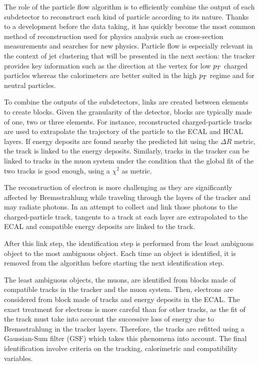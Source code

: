     The role of the particle flow algorithm \cite{particleFlow} is to efficiently combine the output of each
    subdetector to reconstruct each kind of particle according to its nature. Thanks
    to a development before the data taking, it has quickly become the most common
    method of reconstruction used for physics analysis such as cross-section measurements
    and searches for new physics. Particle flow is especially relevant in the context
    of jet clustering that will be presented in the next section: the tracker provides
    key information such as the direction at the vertex for low $p_T$ charged particles
    whereas the calorimeters are better suited in the high $p_T$ regime and for neutral
    particles.

    To combine the outputs of the subdetectors, links are created between elements
    to create blocks. Given the granularity of the detector, blocks are typically made
    of one, two or three elements. For instance, reconstructed charged-particle tracks
    are used to extrapolate the trajectory of the particle to the ECAL and HCAL layers.
    If energy deposits are found nearby the predicted hit using the $\Delta R$
    metric, the track is linked to the energy deposits. Similarly, tracks in the
    tracker can be linked to tracks in the muon system under the condition that the
    global fit of the two tracks is good enough, using a $\chi^2$ as metric.

    The reconstruction of electron is more challenging as they are significantly
    affected by Bremsstrahlung while traveling through the layers of the tracker
    and may radiate photons. In an attempt to collect and link those photons to the
    charged-particle track, tangents to a track at each layer are extrapolated to the
    ECAL and compatible energy deposits are linked to the track.

    After this link step, the identification step is performed from the least ambiguous
    object to the most ambiguous object. Each time an object is identified, it is
    removed from the algorithm before starting the next identification step.

    The least ambiguous objects, the muons, are identified from blocks made of compatible
    tracks in the tracker and the muon system. Then, electrons are considered from
    block made of tracks and energy deposits in the ECAL. The exact treatment for
    electrons is more careful than for other tracks, as the fit of the track must take
    into account the successive loss of energy due to Bremsstrahlung in the tracker
    layers. Therefore, the tracks are refitted using a Gaussian-Sum filter (GSF)
    \cite{GSFelectrons} which takes this phenomena into account. The final identification
    involve criteria on the tracking, calorimetric and compatibility variables.

